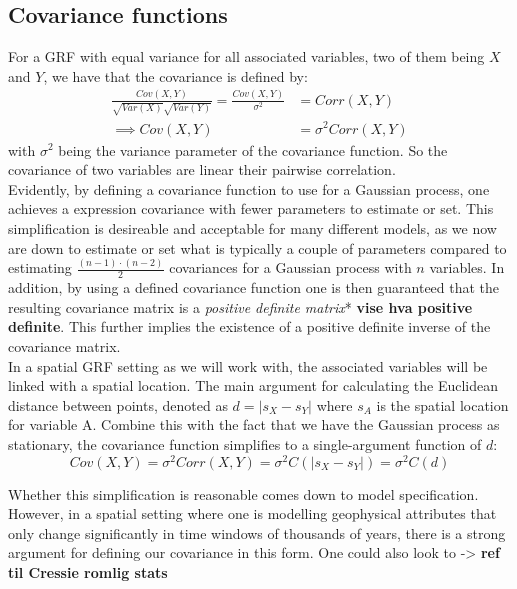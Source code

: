 \documentclass{article}
\begin{document}
\subsection{Covariance functions} \label{sec:covariance_functions}

For a GRF with equal variance for all associated variables, two of them being $X$ and $Y$, we have that the covariance is defined by:
\begin{align*}
\frac{Cov( X, Y )}{\sqrt{Var( X )}\sqrt{Var( Y )}} = \frac{Cov( X, Y )}{\sigma^2} &= Corr(X, Y) \\
\implies  Cov( X, Y ) &= \sigma^2 Corr(X, Y)
\end{align*}
with $\sigma^2$ being the variance parameter of the covariance function. So the covariance of two variables are linear their pairwise correlation. \\

Evidently, by defining a covariance function to use for a Gaussian process, one achieves a expression covariance with fewer parameters to estimate or set. This simplification is desireable and acceptable for many different models, as we now are down to estimate or set what is typically a couple of parameters compared to estimating $\frac{(n-1)\cdot(n - 2)}{2}$ covariances for a Gaussian process with $n$ variables. In addition, by using a defined covariance function one is then guaranteed that the resulting covariance matrix is a \textit{positive definite matrix}* \textbf{vise hva positive definite}. This further implies the existence of a positive definite inverse of the covariance matrix. \\

In a spatial GRF setting as we will work with, the associated variables will be linked with a spatial location. The main argument for calculating the Euclidean distance between points, denoted as $d = |s_X - s_Y|$ where $s_A$ is the spatial location for variable A. Combine this with the fact that we have the Gaussian process as stationary, the covariance function simplifies to a single-argument function of $d$:
\begin{equation}
Cov(X, Y) = \sigma^2Corr(X, Y) = \sigma^2C(|s_X - s_Y|) = \sigma^2C(d)
\end{equation}

Whether this simplification is reasonable comes down to model specification. However, in a spatial setting where one is modelling geophysical attributes that only change significantly in time windows of thousands of years, there is a strong argument for defining our covariance in this form. One could also look to ->  \textbf{ref til Cressie romlig stats}
\end{document}
